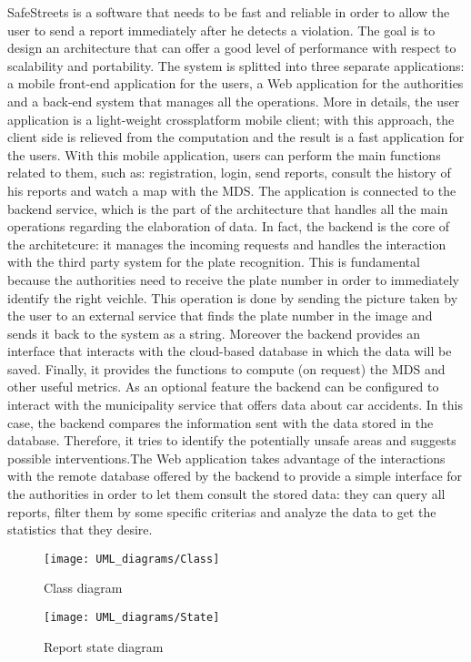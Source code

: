 SafeStreets is a software that needs to be fast and reliable in order to allow the user to send a report immediately after he detects a violation. The goal is to design an architecture that can offer a good level of performance with respect to scalability and portability. The system is splitted into three separate applications: a mobile front-end application for the users, a Web application for the authorities and a back-end system that manages all the operations. More in details, the user application is a light-weight crossplatform mobile client; with this approach, the client side is relieved from the computation and the result is a fast application for the users. With this mobile application, users can perform the main functions related to them, such as: registration, login, send reports, consult the history of his reports and watch a map with the MDS. The application is connected to the backend service, which is the part of the architecture that handles all the main operations regarding the elaboration of data. In fact, the backend is the core of the architetcure: it manages the incoming requests and handles the interaction with the third party system for the plate recognition. This is fundamental because the authorities need to receive the plate number in order to immediately identify the right veichle. This operation is done by sending the picture taken by the user to an external service that finds the plate number in the image and sends it back to the system as a string. Moreover the backend provides an interface that interacts with the cloud-based database in which the data will be saved. Finally, it provides the functions to compute (on request) the MDS and other useful metrics. As an optional feature the backend can be configured to interact with the municipality service that offers data about car accidents. In this case, the backend compares the information sent with the data stored in the database. Therefore, it tries to identify the potentially unsafe areas and suggests possible interventions.\newline The Web application takes advantage of the interactions with the remote database offered by the backend to provide a simple interface for the authorities in order to let them consult the stored data: they can query all reports, filter them by some specific criterias and analyze the data to get the statistics that they desire.
\begin{figure}[H]
    \centering
    \texttt{[image: UML\_diagrams/Class]}
    \caption{Class diagram}
    \label{fig:class_diagram}
\end{figure}
\begin{figure}[H]
    \centering
    \texttt{[image: UML\_diagrams/State]}
    \caption{Report state diagram}
    \label{fig:state}
\end{figure}
\newpage